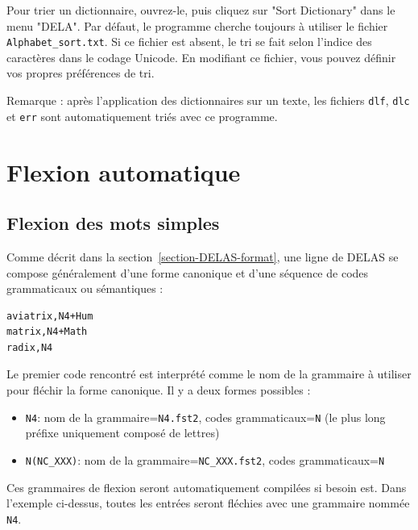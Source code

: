 \bigskip
\noindent Pour trier un dictionnaire, ouvrez-le, puis cliquez sur "Sort Dictionary" dans le menu
"DELA". Par défaut, le programme cherche toujours à utiliser le fichier \verb+Alphabet_sort.txt+.
Si ce fichier est absent, le tri se fait selon l’indice des caractères dans le codage Unicode.
En modifiant ce fichier, vous pouvez définir vos propres préférences de tri.


\bigskip
\noindent Remarque : après l’application des dictionnaires sur un texte, les fichiers
\verb+dlf+, \verb+dlc+ et \verb+err+ sont automatiquement triés avec ce programme.
 



\section{Flexion automatique}
\label{section-automatic-inflection}
\subsection{Flexion des mots simples}

Comme décrit dans la section~\ref{section-DELAS-format}, une ligne de DELAS se compose généralement
d’une forme canonique et d’une séquence de codes grammaticaux ou sémantiques :


\begin{verbatim}
aviatrix,N4+Hum
matrix,N4+Math
radix,N4
\end{verbatim}

\bigskip
\noindent Le premier code rencontré est interprété comme le nom de la grammaire à utiliser pour
fléchir la forme canonique. Il y a deux formes possibles :

\begin{itemize}
\item \verb+N4+: nom de la grammaire=\verb+N4.fst2+, codes grammaticaux=\verb+N+
	(le plus long préfixe uniquement composé de lettres)
  \item \verb+N(NC_XXX)+: nom de la grammaire=\verb+NC_XXX.fst2+, codes grammaticaux=\verb+N+
\end{itemize}

\bigskip
\noindent Ces grammaires de flexion
seront automatiquement compilées si
besoin est. Dans l’exemple ci-dessus, toutes les entrées seront fléchies avec une grammaire nommée
\verb+N4+.

